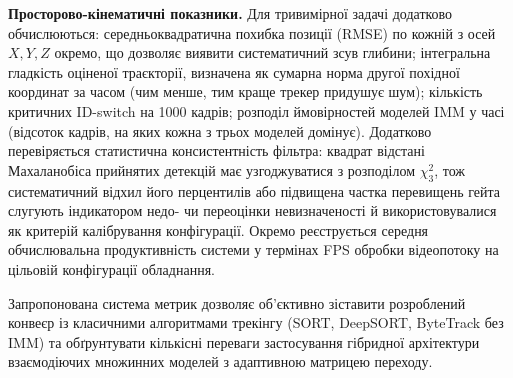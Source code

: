 \textbf{Просторово-кінематичні показники.}
Для тривимірної задачі додатково обчислюються:
середньоквадратична похибка позиції (\gls{RMSE}) по кожній з осей $X, Y, Z$ окремо, що
дозволяє виявити систематичний зсув глибини; інтегральна гладкість
оціненої траєкторії, визначена як сумарна норма другої похідної координат за часом
(чим менше, тим краще трекер придушує шум); кількість критичних ID-switch на 1000
кадрів; розподіл ймовірностей моделей \gls{IMM} у часі (відсоток кадрів, на яких
кожна з трьох моделей домінує). Додатково перевіряється статистична консистентність
фільтра: квадрат відстані Махаланобіса прийнятих детекцій має узгоджуватися з
розподілом $\chi^2_3$, тож систематичний відхил його перцентилів або підвищена частка
перевищень гейта слугують індикатором недо- чи переоцінки невизначеності й
використовувалися як критерій калібрування конфігурації. Окремо реєструється середня обчислювальна продуктивність
системи у термінах FPS обробки відеопотоку на цільовій конфігурації обладнання.

Запропонована система метрик дозволяє об'єктивно зіставити розроблений конвеєр
із класичними алгоритмами трекінгу (SORT, DeepSORT, ByteTrack без \gls{IMM}) та
обґрунтувати кількісні переваги застосування гібридної архітектури взаємодіючих
множинних моделей з адаптивною матрицею переходу.

